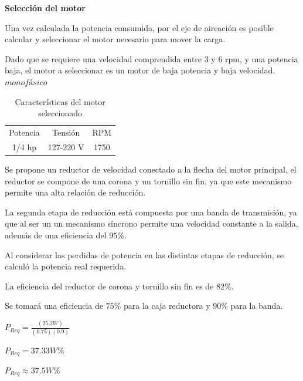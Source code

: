 \textbf{Selección del motor}

Una vez calculada la potencia consumida, por el eje de aireación es posible calcular y seleccionar el motor necesario para mover la carga.

Dado que se requiere una velocidad comprendida entre 3 y 6 rpm, y una potencia baja, el motor a seleccionar es un motor de baja potencia y baja velocidad.
$monofásico$

\begin{table}[h]
    \centering
    \caption{Características del motor seleccionado} 
    \begin{tabular}{c|c|c}
        Potencia & Tensión & RPM \\
        1/4 hp  & 127-220 V & 1750 
    \end{tabular}
    \label{tab:DatosMotro}
\end{table}

Se propone un reductor de velocidad conectado a la flecha del motor principal, el reductor se compone de una corona y un tornillo sin fin, ya que este mecanismo permite una alta relación de reducción.

La segunda etapa de reducción está compuesta por una banda de transmisión, ya que al ser un un mecanismo síncrono permite una velocidad constante a la salida, además de una eficiencia del $95\%$.

Al considerar las perdidas de potencia en las distintas etapas de reducción, se calculó la potencia real requerida. 

La eficiencia del reductor de corona y tornillo sin fin es de $82\%$.

Se tomará una eficiencia de $75\%$ para la caja reductora y $90\%$ para la banda.\cite{Mott}

\begin{center}
    $P_{Req}=\frac{(25.2 W)}{(0.75)(0.9)}$\\
\end{center}
\begin{center}    
    $P_{Req}=37.33 W\%$\\
\end{center}
\begin{center}
    $P_{Req}\approx 37.5 W\%$ 
\end{center}

